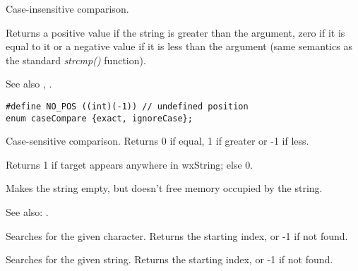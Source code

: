
Case-insensitive comparison.

Returns a positive value if the string is greater than the argument, zero if
it is equal to it or a negative value if it is less than the argument (same semantics
as the standard {\it strcmp()} function).

See also , .

\label{wxstringcompareto}

\begin{verbatim}
#define NO_POS ((int)(-1)) // undefined position
enum caseCompare {exact, ignoreCase};
\end{verbatim}


Case-sensitive comparison. Returns 0 if equal, 1 if greater or -1 if less.

\label{wxstringcontains}


Returns 1 if target appears anywhere in wxString; else 0.

\label{wxstringempty}


Makes the string empty, but doesn't free memory occupied by the string.

See also: .

\label{wxstringfind}


Searches for the given character. Returns the starting index, or -1 if not found.


Searches for the given string. Returns the starting index, or -1 if not found.

\label{wxstringfirst}




